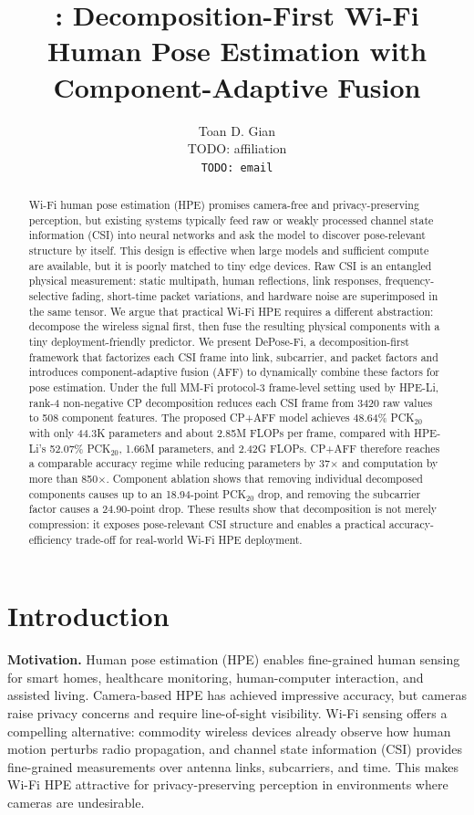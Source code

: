\documentclass[letterpaper]{article}
\title{\method: Decomposition-First Wi-Fi Human Pose Estimation with Component-Adaptive Fusion}
\author{
Toan D. Gian\\
TODO: affiliation\\
\texttt{TODO: email}
}
\newcommand{\method}{DePose-Fi}
\begin{document}
\maketitle

\begin{abstract}
Wi-Fi human pose estimation (HPE) promises camera-free and privacy-preserving perception, but existing systems typically feed raw or weakly processed channel state information (CSI) into neural networks and ask the model to discover pose-relevant structure by itself. This design is effective when large models and sufficient compute are available, but it is poorly matched to tiny edge devices. Raw CSI is an entangled physical measurement: static multipath, human reflections, link responses, frequency-selective fading, short-time packet variations, and hardware noise are superimposed in the same tensor. We argue that practical Wi-Fi HPE requires a different abstraction: decompose the wireless signal first, then fuse the resulting physical components with a tiny deployment-friendly predictor. We present \method, a decomposition-first framework that factorizes each CSI frame into link, subcarrier, and packet factors and introduces component-adaptive fusion (AFF) to dynamically combine these factors for pose estimation. Under the full MM-Fi protocol-3 frame-level setting used by HPE-Li, rank-4 non-negative CP decomposition reduces each CSI frame from 3420 raw values to 508 component features. The proposed CP+AFF model achieves 48.64\% PCK$_{20}$ with only 44.3K parameters and about 2.85M FLOPs per frame, compared with HPE-Li's 52.07\% PCK$_{20}$, 1.66M parameters, and 2.42G FLOPs. CP+AFF therefore reaches a comparable accuracy regime while reducing parameters by 37$\times$ and computation by more than 850$\times$. Component ablation shows that removing individual decomposed components causes up to an 18.94-point PCK$_{20}$ drop, and removing the subcarrier factor causes a 24.90-point drop. These results show that decomposition is not merely compression: it exposes pose-relevant CSI structure and enables a practical accuracy-efficiency trade-off for real-world Wi-Fi HPE deployment.
\end{abstract}

\section{Introduction}

\textbf{Motivation.}
Human pose estimation (HPE) enables fine-grained human sensing for smart homes, healthcare monitoring, human-computer interaction, and assisted living. Camera-based HPE has achieved impressive accuracy, but cameras raise privacy concerns and require line-of-sight visibility. Wi-Fi sensing offers a compelling alternative: commodity wireless devices already observe how human motion perturbs radio propagation, and channel state information (CSI) provides fine-grained measurements over antenna links, subcarriers, and time. This makes Wi-Fi HPE attractive for privacy-preserving perception in environments where cameras are undesirable.
\end{document}
